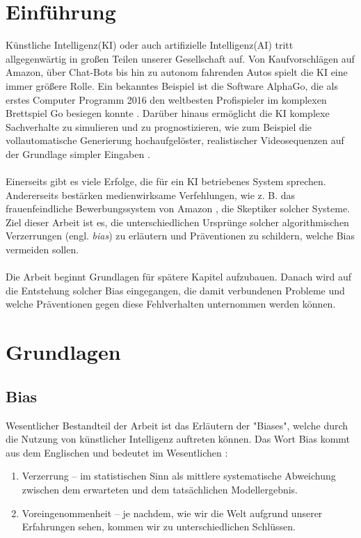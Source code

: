 \documentclass[12pt,oneside,a4paper,parskip]{scrbook}
\begin{document}
\mainmatter

\chapter{Einführung}
\label{chapter:intro}
Künstliche Intelligenz(KI) oder auch artifizielle Intelligenz(AI) tritt allgegenwärtig in großen Teilen unserer Gesellschaft auf. Von Kaufvorschlägen auf Amazon, über Chat-Bots bis hin zu autonom fahrenden Autos spielt die KI eine immer größere Rolle. Ein bekanntes Beispiel ist die Software AlphaGo, die als erstes Computer Programm 2016 den weltbesten Profispieler im komplexen Brettspiel Go besiegen konnte \cite{alphaGo}. Darüber hinaus ermöglicht die KI komplexe Sachverhalte zu simulieren und zu prognostizieren, wie zum Beispiel die vollautomatische Generierung hochaufgelöster, realistischer Videosequenzen auf der Grundlage simpler Eingaben \cite{videoToVideo}.
\\\\
Einerseits gibt es viele Erfolge, die für ein KI betriebenes System sprechen. Andererseits bestärken medienwirksame Verfehlungen, wie z. B. das frauenfeindliche Bewerbungssystem von Amazon \cite{amazon}, die Skeptiker solcher Systeme. Ziel dieser Arbeit ist es, die unterschiedlichen Ursprünge solcher algorithmischen Verzerrungen (engl. \textit{bias}) zu erläutern und Präventionen zu schildern, welche Bias vermeiden sollen.
\\\\
Die Arbeit beginnt Grundlagen für spätere Kapitel aufzubauen. Danach wird auf die Entstehung solcher Bias eingegangen, die damit verbundenen Probleme und welche Präventionen gegen diese Fehlverhalten unternommen werden können.
\chapter{Grundlagen}
\section{Bias}
Wesentlicher Bestandteil der Arbeit ist das Erläutern der "Biases", welche durch die Nutzung von künstlicher Intelligenz auftreten können. Das Wort Bias kommt aus dem Englischen und bedeutet im Wesentlichen \cite{biasEffekt}:
\begin{enumerate}
	\item Verzerrung – im statistischen Sinn als mittlere systematische Abweichung zwischen dem erwarteten und dem tatsächlichen Modellergebnis.
	\item Voreingenommenheit – je nachdem, wie wir die Welt aufgrund unserer Erfahrungen sehen, kommen wir zu unterschiedlichen Schlüssen. 
\end{enumerate}
\end{document}
